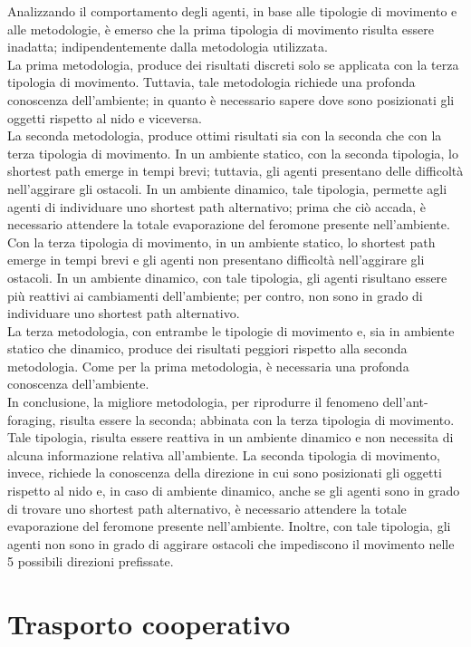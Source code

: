 \documentclass[12pt,a4paper,openright,twoside]{report}
\begin{document}
Analizzando il comportamento degli agenti, in base alle tipologie di movimento e alle metodologie, è emerso che la prima tipologia di movimento risulta essere inadatta; indipendentemente dalla metodologia utilizzata.\\
La prima metodologia, produce dei risultati discreti solo se applicata con la terza tipologia di movimento. Tuttavia, tale metodologia richiede una profonda conoscenza dell'ambiente; in quanto è necessario sapere dove sono posizionati gli oggetti rispetto al nido e viceversa.\\
La seconda metodologia, produce ottimi risultati sia con la seconda che con la terza tipologia di movimento. In un ambiente statico, con la seconda tipologia, lo shortest path emerge in tempi brevi; tuttavia, gli agenti presentano delle difficoltà nell'aggirare gli ostacoli. In un ambiente dinamico, tale tipologia, permette agli agenti di individuare uno shortest path alternativo; prima che ciò accada, è necessario attendere la totale evaporazione del feromone presente nell'ambiente. Con la terza tipologia di movimento, in un ambiente statico, lo shortest path emerge in tempi brevi e gli agenti non presentano difficoltà nell'aggirare gli ostacoli. In un ambiente dinamico, con tale tipologia, gli agenti risultano essere più reattivi ai cambiamenti dell'ambiente; per contro, non sono in grado di individuare uno shortest path alternativo.\\
La terza metodologia, con entrambe le tipologie di movimento e, sia in ambiente statico che dinamico, produce dei risultati peggiori rispetto alla seconda metodologia. Come per la prima metodologia, è necessaria una profonda conoscenza dell'ambiente.\\
In conclusione, la migliore metodologia, per riprodurre il fenomeno dell'ant-foraging, risulta essere la seconda; abbinata con la terza tipologia di movimento. Tale tipologia, risulta essere reattiva in un ambiente dinamico e non necessita di alcuna informazione relativa all'ambiente. La seconda tipologia di movimento, invece, richiede la conoscenza della direzione in cui sono posizionati gli oggetti rispetto al nido e, in caso di ambiente dinamico, anche se gli agenti sono in grado di trovare uno shortest path alternativo, è necessario attendere la totale evaporazione del feromone presente nell'ambiente. Inoltre, con tale tipologia, gli agenti non sono in grado di aggirare ostacoli che impediscono il movimento nelle 5 possibili direzioni prefissate.

\section{Trasporto cooperativo}
\end{document}
